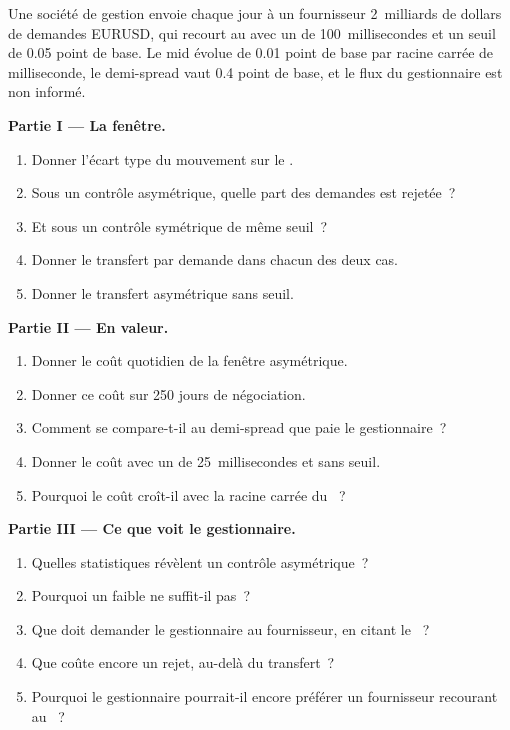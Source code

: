 \begin{problem}\label{pb:m2:fx-spot-microstructure:1}
Une société de gestion envoie chaque jour à un fournisseur 2~milliards de dollars de demandes EURUSD,
qui recourt au  avec un  de 100~millisecondes et un
seuil de 0.05 point de base. Le mid évolue de 0.01 point de base par racine carrée de milliseconde, le
demi-spread vaut 0.4 point de base, et le flux du gestionnaire est non informé.

\medskip\noindent\textbf{Partie I --- La fenêtre.}
\begin{enumerate}
\item Donner l'écart type du mouvement sur le .
\item Sous un contrôle asymétrique, quelle part des demandes est rejetée~?
\item Et sous un contrôle symétrique de même seuil~?
\item Donner le transfert par demande dans chacun des deux cas.
\item Donner le transfert asymétrique sans seuil.
\end{enumerate}

\medskip\noindent\textbf{Partie II --- En valeur.}
\begin{enumerate}[resume]
\item Donner le coût quotidien de la fenêtre asymétrique.
\item Donner ce coût sur 250 jours de négociation.
\item Comment se compare-t-il au demi-spread que paie le gestionnaire~?
\item Donner le coût avec un  de 25~millisecondes et sans seuil.
\item Pourquoi le coût croît-il avec la racine carrée du ~?
\end{enumerate}

\medskip\noindent\textbf{Partie III --- Ce que voit le gestionnaire.}
\begin{enumerate}[resume]
\item Quelles statistiques révèlent un contrôle asymétrique~?
\item Pourquoi un faible  ne suffit-il pas~?
\item Que doit demander le gestionnaire au fournisseur, en citant le ~?
\item Que coûte encore un rejet, au-delà du transfert~?
\item Pourquoi le gestionnaire pourrait-il encore préférer un fournisseur recourant au ~?
\end{enumerate}


\end{problem}
